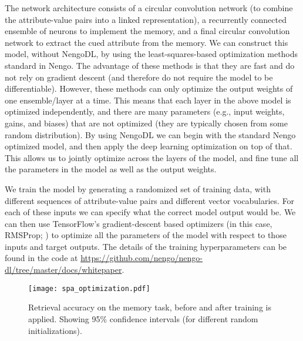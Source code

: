 \documentclass{article}
\begin{document}
The network architecture consists of a circular convolution network (to combine the attribute-value pairs into a linked representation), a recurrently connected ensemble of neurons to implement the memory, and a final circular convolution network to extract the cued attribute from the memory.  We can construct this model, without NengoDL, by using the  least-squares-based optimization methods standard in Nengo.  The advantage of these methods is that they are fast and do not rely on gradient descent (and therefore do not require the model to be differentiable).  However, these methods can only optimize the output weights of one ensemble/layer at a time.  This means that each layer in the above model is optimized independently, and there are many parameters (e.g., input weights, gains, and biases) that are not optimized (they are typically chosen from some random distribution).  By using NengoDL we can begin with the standard Nengo optimized model, and then apply the deep learning optimization on top of that.  This allows us to jointly optimize across the layers of the model, and fine tune all the parameters in the model as well as the output weights.

We train the model by generating a randomized set of training data, with different sequences of attribute-value pairs and different vector vocabularies.  For each of these inputs we can specify what the correct model output would be.  We can then use TensorFlow's gradient-descent based optimizers (in this case, RMSProp; \citealt{Tieleman2012}) to optimize all the parameters of the model with respect to those inputs and target outputs.  The details of the training hyperparameters can be found in the code at \url{https://github.com/nengo/nengo-dl/tree/master/docs/whitepaper}.

\begin{figure}
\centering
\texttt{[image: spa\_optimization.pdf]}
\caption{Retrieval accuracy on the memory task, before and after training is applied.  Showing 95\% confidence intervals (for different random initializations).}
\label{fig:spa_optimization}
\end{figure}
\end{document}
